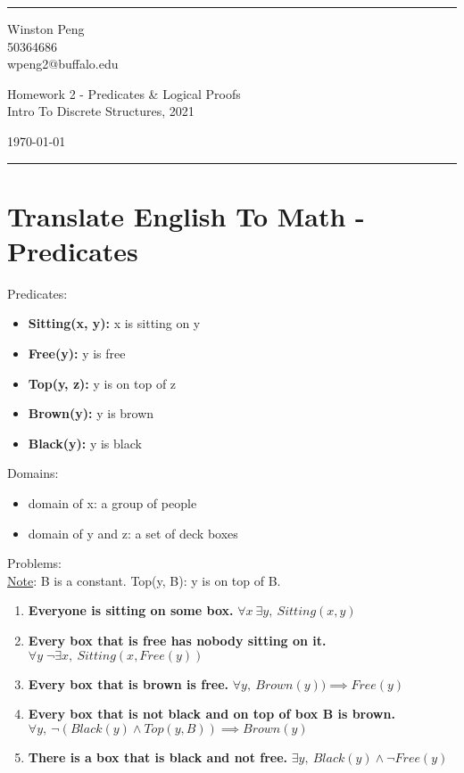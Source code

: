 \documentclass[a4paper]{article}
\begin{document}

\fancyhead[C]{}
\hrule \medskip %
\begin{minipage}{0.295\textwidth} 
\raggedright
\footnotesize
Winston Peng \hfill\\   
50364686 \hfill\\
wpeng2@buffalo.edu
\end{minipage}
\begin{minipage}{0.4\textwidth} 
\centering 
\large 
Homework 2 - Predicates \& Logical Proofs\\ 
\normalsize 
Intro To Discrete Structures, 2021\\ 
\end{minipage}
\begin{minipage}{0.295\textwidth} 
\raggedleft
\today\hfill\\
\end{minipage}
\medskip\hrule 
\bigskip

\section{Translate English To Math - Predicates}
\large Predicates:
\normalsize
\begin{itemize}
    \item \textbf{Sitting(x, y):} x is sitting on y
    \item \textbf{Free(y):} y is free
    \item \textbf{Top(y, z):} y is on top of z
    \item \textbf{Brown(y):} y is brown
    \item \textbf{Black(y):} y is black
\end{itemize}
\large Domains:
\normalsize
\begin{itemize}
    \item domain of x: {a group of people}
    \item domain of y and z: {a set of deck boxes}
\end{itemize}
\large Problems: \\
\smallskip
\normalsize
\underline{Note}: B is a constant. Top(y, B): y is on top of B.
\begin{enumerate}
    \item \textbf{Everyone is sitting on some box.} $\forall x \:\exists y, \: Sitting(x, y)$
    \item \textbf{Every box that is free has nobody sitting on it.} $\forall y \; \neg \exists x, \: Sitting(x, Free(y))$
    \item \textbf{Every box that is brown is free.} $\forall y, \: Brown(y)) \implies Free(y)$
    \item \textbf{Every box that is not black and on top of box B is brown.} $\forall y, \: \neg(Black(y) \land Top(y, B)) \implies Brown(y)$
    \item \textbf{There is a box that is black and not free.} $\exists y, \: Black(y) \land \neg Free(y) $
\end{enumerate}
\end{document}
